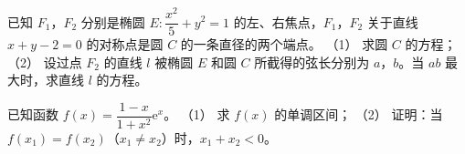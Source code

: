 \begin{question}
已知 $F_1$，$F_2$ 分别是椭圆 $E:\dfrac{x^2}5+y^2=1$ 的左、右焦点，$F_1$，$F_2$ 关于直线 $x+y-2=0$ 的对称点是圆 $C$ 的一条直径的两个端点。
（1） 求圆 $C$ 的方程；
（2） 设过点 $F_2$ 的直线 $l$ 被椭圆 $E$ 和圆 $C$ 所截得的弦长分别为 $a$，$b$。当 $ab$ 最大时，求直线 $l$ 的方程。
\end{question}
\begin{question}
已知函数 $f(x)=\dfrac{1-x}{1+x^2}\mathrm e^x$。
（1） 求 $f(x)$ 的单调区间；
（2） 证明：当 $f(x_1)=f(x_2)$（$x_1\ne x_2$）时，$x_1+x_2<0$。

\end{question}